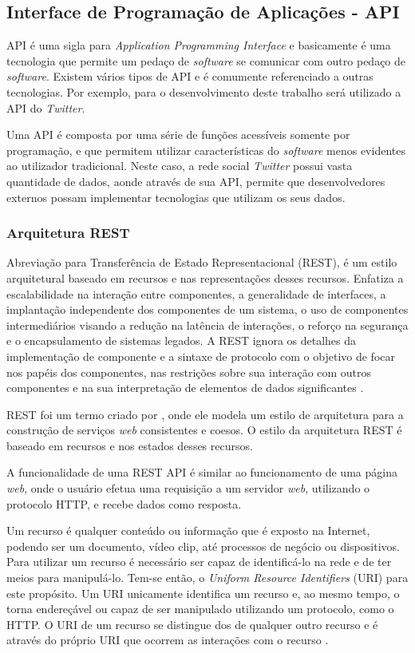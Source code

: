 \subsection{Interface de Programação de Aplicações - API}\label{subsec: api}
API é uma sigla para \textit{Application Programming Interface} e basicamente é uma tecnologia que permite um pedaço de \textit{software} se comunicar com outro pedaço de \textit{software}. Existem vários tipos de API e é comumente referenciado a outras tecnologias. Por exemplo, para o desenvolvimento deste trabalho será utilizado a API do \textit{Twitter}. 

Uma API é composta por uma série de funções acessíveis somente por programação, e que permitem utilizar características do \textit{software} menos evidentes ao utilizador tradicional. Neste caso, a rede social \textit{Twitter} possui vasta quantidade de dados, aonde através de sua API, permite que desenvolvedores externos possam implementar tecnologias que utilizam os seus dados.


\subsubsection{Arquitetura REST}
Abreviação para Transferência de Estado Representacional (REST), é um estilo arquitetural baseado em recursos e nas representações desses recursos. Enfatiza a escalabilidade na interação entre componentes, a generalidade de interfaces, a implantação independente dos componentes de um sistema, o uso de componentes intermediários visando a redução na latência de interações, o reforço na segurança e o encapsulamento de sistemas legados. A REST ignora os detalhes da implementação de componente e a sintaxe de protocolo com o objetivo de focar nos papéis dos componentes, nas restrições sobre sua interação com outros componentes e na sua interpretação de elementos de dados significantes \cite{rest}.

REST foi um termo criado por , onde ele modela um estilo de arquitetura para a construção de serviços \textit{web} consistentes e coesos. O estilo da arquitetura REST é baseado em recursos e nos estados desses recursos.

A funcionalidade de uma REST API é similar ao funcionamento de uma página \textit{web}, onde o usuário efetua uma requisição a um servidor \textit{web}, utilizando o protocolo HTTP, e recebe dados como resposta.

Um recurso é qualquer conteúdo ou informação que é exposto na Internet, podendo ser um documento, vídeo clip, até processos de negócio ou dispositivos. Para utilizar um recurso é necessário ser capaz de identificá-lo na rede e de ter meios para manipulá-lo. Tem-se então, o \textit{Uniform Resource Identifiers} (URI) para este propósito. Um URI unicamente identifica um recurso e, ao mesmo tempo, o torna endereçável ou capaz de ser manipulado utilizando um protocolo, como o HTTP. O URI de um recurso se distingue dos de qualquer outro recurso e é através do próprio URI que ocorrem as interações com o recurso \cite{rest-book}.

